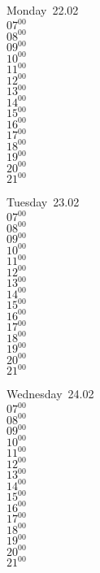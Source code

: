 \documentclass[11pt,a4paper]{book}\usepackage[]{graphicx}\usepackage[]{color}
\begin{document}
\begin{headerbox}
\end{headerbox}
\begin{weekdaybox}
  Monday~22.02\\
  { 
  \vfill
  $07^{00}$\\
$08^{00}$\\
$09^{00}$\\
$10^{00}$\\
$11^{00}$\\
$12^{00}$\\
$13^{00}$\\
$14^{00}$\\
$15^{00}$\\
$16^{00}$\\
$17^{00}$\\
$18^{00}$\\
$19^{00}$\\
$20^{00}$\\
$21^{00}$\\
  }
\end{weekdaybox}
\begin{weekdaybox}
  Tuesday~23.02\\
  { 
  \vfill
  $07^{00}$\\
$08^{00}$\\
$09^{00}$\\
$10^{00}$\\
$11^{00}$\\
$12^{00}$\\
$13^{00}$\\
$14^{00}$\\
$15^{00}$\\
$16^{00}$\\
$17^{00}$\\
$18^{00}$\\
$19^{00}$\\
$20^{00}$\\
$21^{00}$\\
  }
\end{weekdaybox}
\begin{weekdaybox}
  Wednesday~24.02\\
  { 
  \vfill
  $07^{00}$\\
$08^{00}$\\
$09^{00}$\\
$10^{00}$\\
$11^{00}$\\
$12^{00}$\\
$13^{00}$\\
$14^{00}$\\
$15^{00}$\\
$16^{00}$\\
$17^{00}$\\
$18^{00}$\\
$19^{00}$\\
$20^{00}$\\
$21^{00}$\\
  }
\end{weekdaybox}
\end{document}
